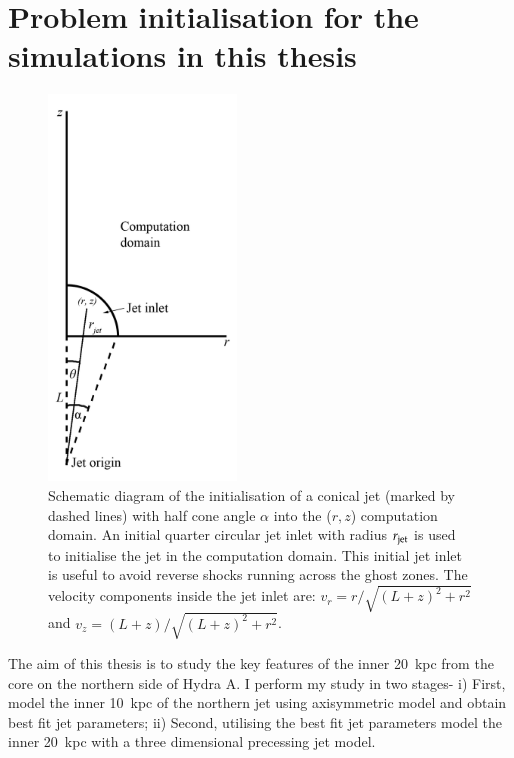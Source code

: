\section{Problem initialisation for the simulations in this thesis}
\begin{figure}
\centering
\includegraphics[width=5cm]{cjt.png}
\caption{Schematic diagram of the initialisation of a conical jet (marked by dashed lines) with half cone angle $\alpha$ into the ($r, z$) computation domain. An initial quarter circular jet inlet with radius $r_{\rm jet}$ is used to initialise the jet in the computation domain. This initial jet inlet is useful to avoid reverse shocks running across the ghost zones. The velocity components inside the jet inlet are: $v_r = r/\sqrt{(L+z)^2+r^2}$ and $v_z = (L+z)/\sqrt{(L+z)^2+r^2}$. }
\label{f:cjt}
\end{figure}


The aim of this thesis is to study the key features of the inner 20~kpc from the core on the northern side of Hydra A. I perform my study in two stages- i) First, model the inner 10~kpc of the northern jet using axisymmetric model and obtain best fit jet parameters; ii) Second, utilising the best fit jet parameters model the inner 20~kpc with a three dimensional precessing jet model. 

